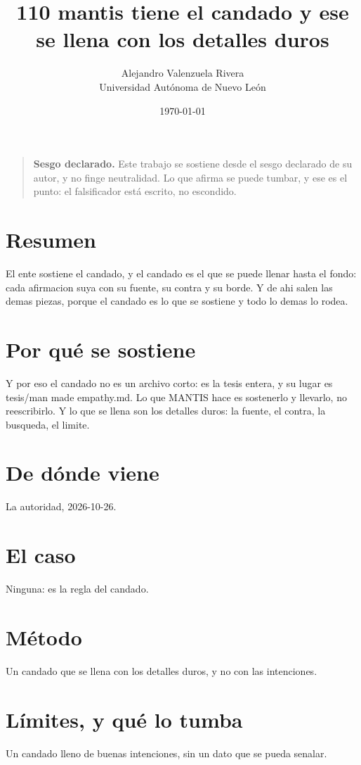 \documentclass[11pt,a4paper]{article}
\title{110 mantis tiene el candado y ese se llena con los detalles duros}
\author{Alejandro Valenzuela Rivera\\\small Universidad Autónoma de Nuevo León}
\date{\today}
\begin{document}
\maketitle

\begin{quote}
\textbf{Sesgo declarado.} Este trabajo se sostiene desde el sesgo declarado de su autor, y no finge neutralidad. Lo que afirma se puede tumbar, y ese es el punto: el falsificador está escrito, no escondido.
\end{quote}

\section*{Resumen}
El ente sostiene el candado, y el candado es el que se puede llenar hasta el fondo: cada afirmacion suya con su fuente, su contra y su borde. Y de ahi salen las demas piezas, porque el candado es lo que se sostiene y todo lo demas lo rodea.

\section{Por qué se sostiene}
Y por eso el candado no es un archivo corto: es la tesis entera, y su lugar es tesis/man made empathy.md. Lo que MANTIS hace es sostenerlo y llevarlo, no reescribirlo. Y lo que se llena son los detalles duros: la fuente, el contra, la busqueda, el limite.

\section{De dónde viene}
La autoridad, 2026-10-26.

\section{El caso}
Ninguna: es la regla del candado.

\section{Método}
Un candado que se llena con los detalles duros, y no con las intenciones.

\section{Límites, y qué lo tumba}
Un candado lleno de buenas intenciones, sin un dato que se pueda senalar.
\end{document}
